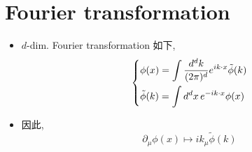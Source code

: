 \section{Fourier transformation}
\begin{itemize}
	\item $d$-dim. Fourier transformation 如下,
	\begin{equation}
		\begin{dcases}
			\phi(x) = \int \frac{d^d k}{(2 \pi)^d} e^{i k \cdot x} \tilde{\phi}(k) \\
			\tilde{\phi}(k) = \int d^d x \, e^{- i k \cdot x} \phi(x)
		\end{dcases}
	\end{equation}
	
	\item 因此,
	\begin{equation}
		\partial_\mu \phi(x) \mapsto i k_\mu \tilde{\phi}(k)
	\end{equation}
\end{itemize}
